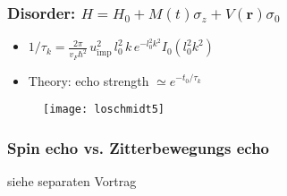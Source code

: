 \documentclass{beamer}
\newcommand{\vq}{\mathbf{r}}
\begin{document}
  \begin{frame}%
  \frametitle{Disorder: $H = H_0 + M(t) \sigma_z + V(\vq) \sigma_0$ }
  \begin{itemize}
  \item $1/\tau_k = \frac{2\pi}{v_F\hbar^2} \,u_{\mathrm{imp}}^2 \,l_0^2 \,k\, e^{-l_0^2k^2} I_0(l_0^2k^2)$
  \item Theory: echo strength $\simeq e^{-t_0/\tau_k}$
  \end{itemize}
  
  \begin{figure}\centering
      \texttt{[image: loschmidt5]}
  \end{figure}
  \end{frame}

 \begin{frame}%
  \frametitle{Spin echo vs. Zitterbewegungs echo}
 
siehe separaten Vortrag
  
  \end{frame}
\end{document}
